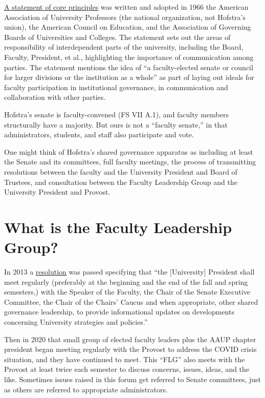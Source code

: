 \documentclass[12pt]{article}
\begin{document}
\href{https://www.aaup.org/reports-publications/aaup-policies-reports/topical-reports/statement-government-colleges-and}{A
statement of core principles} was written and adopted in 1966 the
American Association of University Professors (the national
organization, not Hofstra's union), the American Council on Education,
and the Association of Governing Boards of Universities and Colleges.
The statement sets out the areas of responsibility of interdependent
parts of the university, including the Board, Faculty, President, et
al., highlighting the importance of communication among parties. The
statement mentions the idea of ``a faculty-elected senate or council for
larger divisions or the institution as a whole'' as part of laying out
ideals for faculty participation in institutional governance, in
communication and collaboration with other parties.

Hofstra's senate is faculty-convened (FS VII A.1), and faculty members
structurally have a majority. But ours is not a ``faculty senate,'' in
that administrators, students, and staff also participate and vote.

One might think of Hofstra's shared governance apparatus as including at
least the Senate and its committees, full faculty meetings, the process
of transmitting resolutions between the faculty and the University
President and Board of Trustees, and consultation between the Faculty
Leadership Group and the University President and Provost.

\section{What is the Faculty Leadership
Group?}\label{what-is-the-faculty-leadership-group}

In 2013 a
\href{https://www.hofstra.edu/pdf/faculty/senate/senate_resolution_informational_meetings.pdf}{resolution}
was passed specifying that ``the {[}University{]} President shall meet
regularly (preferably at the beginning and the end of the fall and
spring semesters,) with the Speaker of the Faculty, the Chair of the
Senate Executive Committee, the Chair of the Chairs' Caucus and when
appropriate, other shared governance leadership, to provide
informational updates on developments concerning University strategies
and policies.''

Then in 2020 that small group of elected faculty leaders plus the AAUP
chapter president began meeting regularly with the Provost to address
the COVID crisis situation, and they have continued to meet. This
``FLG'' also meets with the Provost at least twice each semester to
discuss concerns, issues, ideas, and the like. Sometimes issues raised
in this forum get referred to Senate committees, just as others are
referred to appropriate administrators.
\end{document}
